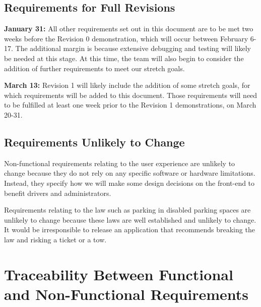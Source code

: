 \documentclass[12pt,letterpaper]{article}
\begin{document}
\subsection{Requirements for Full Revisions}
\textbf{January 31:} All other requirements set out in this document are to be
met two weeks before the Revision 0 demonstration, which will occur between
February 6-17. The additional margin is because extensive debugging and testing
will likely be needed at this stage. At this time, the team will also begin to
consider the addition of further requirements to meet our stretch goals.

\textbf{March 13:} Revision 1 will likely include the addition of some stretch
goals, for which requirements will be added to this document. Those requirements
will need to be fulfilled at least one week prior to the Revision 1
demonstrations, on March 20-31.

\subsection{Requirements Unlikely to Change}
Non-functional requirements relating to the user experience are unlikely to
change because they do not rely on any specific software or hardware
limitations. Instead, they specify how we will make some design decisions on the
front-end to benefit drivers and administrators. 

Requirements relating to the law such as parking in disabled parking spaces are
unlikely to change because these laws are well established and unlikely to
change. It would be irresponsible to release an application that recommends
breaking the law and risking a ticket or a tow.

\newpage
\section{Traceability Between Functional and Non-Functional Requirements}
\label{traceabilityMatrixSection}
\end{document}
